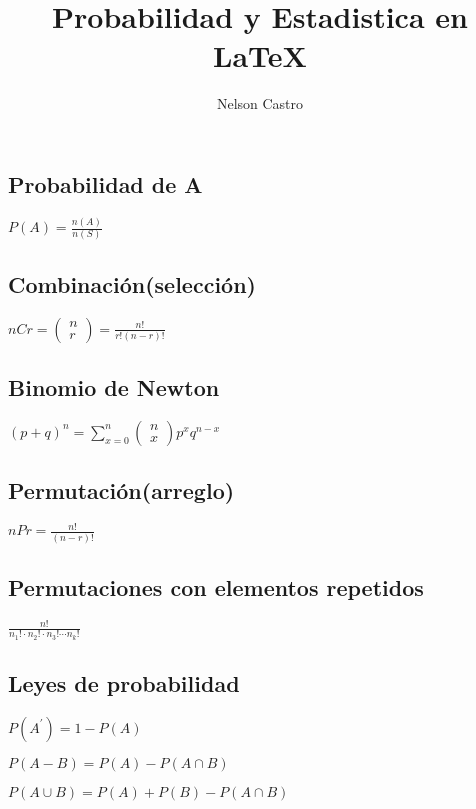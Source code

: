 \documentclass[12pt]{report}
\title{Probabilidad y Estadistica en \LaTeX}
\author{Nelson Castro}
\begin{document}
\maketitle
\newpage
\begin{large}
\begin{center}
\subsection*{Probabilidad de A}

$\displaystyle P(A)=\frac{n(A)}{n(S)}$

\subsection*{Combinación(selección)} 
$\displaystyle nCr=\left(
\begin{array}{c}
n \\
r
\end{array}
\right)= \frac{n!}{r!(n-r)!}$

\subsection*{Binomio de Newton}
$\displaystyle (p+q)^n=\sum^{n}_{x=0}{\left(
\begin{array}{c}
n \\
x
\end{array}
\right)p^xq^{n-x}}$

\subsection*{Permutación(arreglo)}
$\displaystyle nPr=\frac{n!}{(n-r)!}$

\subsection*{Permutaciones con elementos repetidos}

$\displaystyle \frac{n!}{n_1!\cdot n_2! \cdot n_3! \cdots n_k!}$

\subsection*{Leyes de probabilidad}

$\displaystyle P(A^\prime)=1-P(A)$

$\displaystyle P(A-B)=P(A)-P(A\cap B)$

$\displaystyle P(A\cup B)=P(A)+P(B)-P(A \cap B)$


\end{center}
\end{large}
\end{document}
